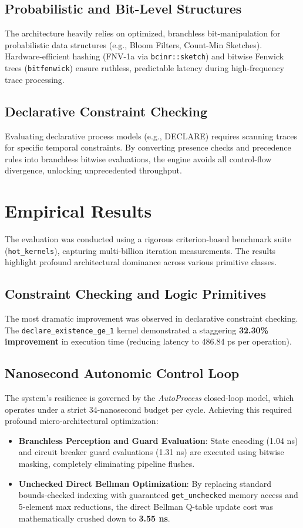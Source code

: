 \documentclass[12pt,a4paper]{report}
\begin{document}
\section{Probabilistic and Bit-Level Structures}
The architecture heavily relies on optimized, branchless bit-manipulation for probabilistic data structures (e.g., Bloom Filters, Count-Min Sketches). Hardware-efficient hashing (FNV-1a via \texttt{bcinr::sketch}) and bitwise Fenwick trees (\texttt{bitfenwick}) ensure ruthless, predictable latency during high-frequency trace processing.

\section{Declarative Constraint Checking}
Evaluating declarative process models (e.g., DECLARE) requires scanning traces for specific temporal constraints. By converting presence checks and precedence rules into branchless bitwise evaluations, the engine avoids all control-flow divergence, unlocking unprecedented throughput.

\chapter{Empirical Results}
The evaluation was conducted using a rigorous criterion-based benchmark suite (\texttt{hot\_kernels}), capturing multi-billion iteration measurements. The results highlight profound architectural dominance across various primitive classes.

\section{Constraint Checking and Logic Primitives}
The most dramatic improvement was observed in declarative constraint checking. The \texttt{declare\_existence\_ge\_1} kernel demonstrated a staggering \textbf{32.30\% improvement} in execution time (reducing latency to 486.84 ps per operation).

\section{Nanosecond Autonomic Control Loop}
The system's resilience is governed by the \textit{AutoProcess} closed-loop model, which operates under a strict 34-nanosecond budget per cycle. Achieving this required profound micro-architectural optimization:
\begin{itemize}
    \item \textbf{Branchless Perception and Guard Evaluation}: State encoding (1.04 ns) and circuit breaker guard evaluations (1.31 ns) are executed using bitwise masking, completely eliminating pipeline flushes.
    \item \textbf{Unchecked Direct Bellman Optimization}: By replacing standard bounds-checked indexing with guaranteed \texttt{get\_unchecked} memory access and 5-element max reductions, the direct Bellman Q-table update cost was mathematically crushed down to \textbf{3.55 ns}.
\end{itemize}
\end{document}
